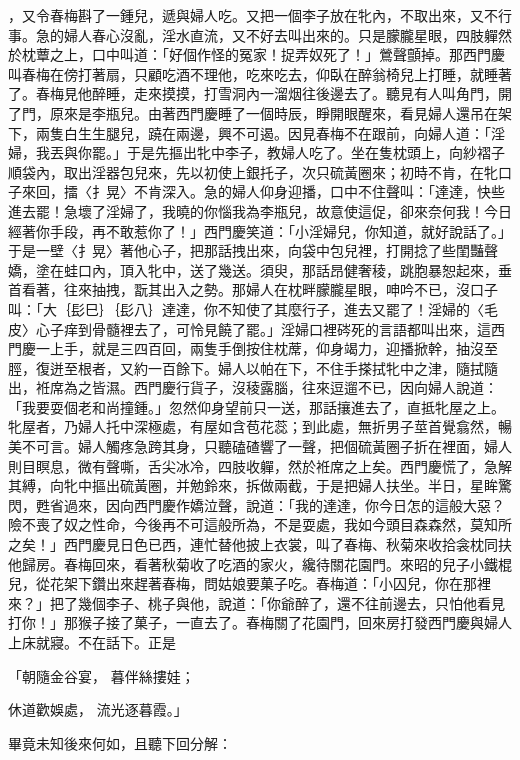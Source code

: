 \begin{showcontents}{}
，又令春梅斟了一鍾兒，遞與婦人吃。又把一個李子放在牝內，不取出來，又不行事。急的婦人春心沒亂，淫水直流，又不好去叫出來的。只是朦朧星眼，四肢軃然於枕蕈之上，口中叫道：「好個作怪的冤家！捉弄奴死了！」鶯聲顫掉。那西門慶叫春梅在傍打著扇，只顧吃酒不理他，吃來吃去，仰臥在醉翁椅兒上打睡，就睡著了。春梅見他醉睡，走來摸摸，打雪洞內一溜烟往後邊去了。聽見有人叫角門，開了門，原來是李瓶兒。由著西門慶睡了一個時辰，睜開眼醒來，看見婦人還吊在架下，兩隻白生生腿兒，蹺在兩邊，興不可遏。因見春梅不在跟前，向婦人道：「淫婦，我丟與你罷。」于是先摳出牝中李子，教婦人吃了。坐在隻枕頭上，向紗褶子順袋內，取出淫器包兒來，先以初使上銀托子，次只硫黃圈來；初時不肯，在牝口子來回，擂〈扌晃〉不肯深入。急的婦人仰身迎播，口中不住聲叫：「達達，快些進去罷！急壞了淫婦了，我曉的你惱我為李瓶兒，故意使這促，卻來奈何我！今日經著你手段，再不敢惹你了！」西門慶笑道：「小淫婦兒，你知道，就好說話了。」于是一壁〈扌晃〉著他心子，把那話拽出來，向袋中包兒裡，打開捻了些閨豔聲嬌，塗在蛙口內，頂入牝中，送了幾送。須臾，那話昂健奢稜，跳胞暴恕起來，垂首看著，往來抽拽，翫其出入之勢。那婦人在枕畔朦朧星眼，呻吟不已，沒口子叫：「大｛髟巳｝｛髟八｝達達，你不知使了其麼行子，進去又罷了！淫婦的〈毛皮〉心子痒到骨髓裡去了，可怜見饒了罷。」淫婦口裡硶死的言語都叫出來，這西門慶一上手，就是三四百回，兩隻手倒按住枕蓆，仰身竭力，迎播掀幹，抽沒至脛，復迸至根者，又約一百餘下。婦人以帕在下，不住手搽拭牝中之津，隨拭隨出，袵席為之皆濕。西門慶行貨子，沒稜露腦，往來逗遛不已，因向婦人說道：「我要耍個老和尚撞鍾。」忽然仰身望前只一送，那話攘進去了，直抵牝屋之上。牝屋者，乃婦人托中深極處，有屋如含苞花蕊；到此處，無折男子莖首覺翕然，暢美不可言。婦人觸疼急跨其身，只聽磕碴響了一聲，把個硫黃圈子折在裡面，婦人則目瞑息，微有聲嘶，舌尖冰冷，四肢收軃，然於袵席之上矣。西門慶慌了，急解其縛，向牝中摳出硫黃圈，并勉鈴來，拆做兩截，于是把婦人扶坐。半日，星眸驚閃，甦省過來，因向西門慶作嬌泣聲，說道：「我的達達，你今日怎的這般大惡？險不喪了奴之性命，今後再不可這般所為，不是耍處，我如今頭目森森然，莫知所之矣！」西門慶見日色已西，連忙替他披上衣裳，叫了春梅、秋菊來收拾衾枕同扶他歸房。春梅回來，看著秋菊收了吃酒的家火，纔待關花園門。來昭的兒子小鐵棍兒，從花架下鑽出來趕著春梅，問姑娘要菓子吃。春梅道：「小囚兒，你在那裡來？」把了幾個李子、桃子與他，說道：「你爺醉了，還不往前邊去，只怕他看見打你！」那猴子接了菓子，一直去了。春梅關了花園門，回來房打發西門慶與婦人上床就寢。不在話下。正是

「朝隨金谷宴，  暮伴絲摟娃；

休道歡娛處，  流光逐暮霞。」

畢竟未知後來何如，且聽下回分解：





\end{showcontents}


